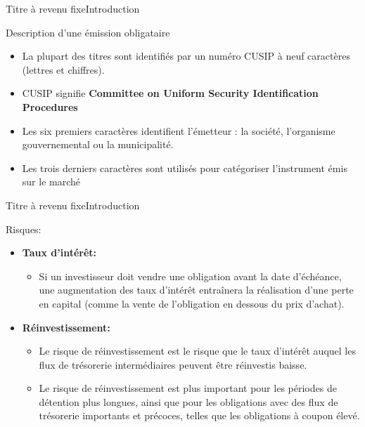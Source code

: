 \documentclass{beamer}
\begin{document}
\begin{frame}{Titre à revenu fixe}{Introduction}
\begin{block}{Description d'une émission obligataire}
\begin{itemize}
\item La plupart des titres sont identifiés par un numéro CUSIP à neuf caractères (lettres et chiffres).
\item CUSIP signifie \textbf{Committee on Uniform Security Identification Procedures}
\item Les six premiers caractères identifient l'émetteur : la société, l'organisme gouvernemental ou la municipalité.
\item Les trois derniers caractères sont utilisés pour catégoriser l'instrument émis sur le marché
\end{itemize}
\end{block}

\end{frame}


\begin{frame}{Titre à revenu fixe}{Introduction}
\begin{block}{Risques:}
\begin{itemize}
\item \textbf{Taux d’intérêt:} 
\begin{itemize}
\item Si un investisseur doit vendre une obligation avant la date d'échéance, une augmentation des taux d'intérêt entraînera la réalisation d'une perte en capital (comme la vente de l'obligation en dessous du prix d'achat).
\end{itemize}
\item \textbf{Réinvestissement:}
\begin{itemize}
\item Le risque de réinvestissement est le risque que le taux d'intérêt auquel les flux de trésorerie intermédiaires peuvent être réinvestis baisse.
\item Le risque de réinvestissement est plus important pour les périodes de détention plus longues, ainsi que pour les obligations avec des flux de trésorerie importants et précoces, telles que les obligations à coupon élevé.
\end{itemize}
\end{itemize}
\end{block}

\end{frame}
\end{document}
